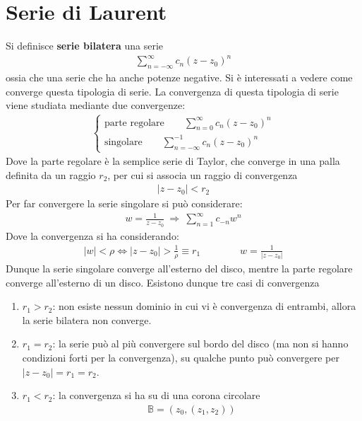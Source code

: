 \documentclass[a4paper, oneside]{article}
\begin{document}
\section{Serie di Laurent}
\begin{definition}
    Si definisce \textbf{serie bilatera}  una serie
    \begin{align}
        \sum_{n = -\infty }^{\infty } c_n(z - z_0)^{n} 
    \end{align}
    ossia che una serie che ha anche potenze negative. Si è interessati 
    a vedere come converge questa tipologia di serie. La convergenza
    di questa tipologia di serie viene studiata mediante due convergenze:
    \begin{align}
        \left\{\begin{array}{l}
            \text{parte regolare} \qquad \sum_{n = 0}^{\infty } c_n(z - z_0)^{n} \\
            \text{singolare} \qquad \sum_{n = -\infty }^{-1} c_n(z - z_0)^{n} 
        \end{array}\right.
    \end{align}
    Dove la parte regolare è la semplice serie di Taylor, che converge in una
    palla definita da un raggio $r_2$, per cui si associa un raggio di convergenza
    \begin{align}
        \left| z - z_0 \right| < r_2
    \end{align}
    Per far convergere la serie singolare si può considerare:
    \begin{align}
        w = \frac{1}{z - z_0} \ \Longrightarrow \ \sum_{n = 1}^{\infty } c_{-n}w^{n}
    \end{align}
    Dove la convergenza si ha considerando:
    \begin{align}
        \left| w \right| < \rho \Longleftrightarrow  \left| z - z_0 \right|   > \frac{1}{\rho} \equiv r_1 \qquad \qquad w = \frac{1}{\left| z - z_0 \right| }
    \end{align}
    Dunque la serie singolare converge all'esterno del disco, mentre la parte regolare converge all'esterno di un disco. Esistono dunque 
    tre casi di convergenza
    \begin{enumerate}
        \item $r_1 > r_2$: non esiste nessun dominio in cui vi è convergenza di entrambi, allora 
        la serie bilatera non converge.
        \item $r_1 = r_2$: la serie può al più convergere sul bordo 
        del disco (ma non si hanno condizioni forti per la convergenza), su qualche 
        punto può convergere per $\left| z - z_0  \right| = r_1 = r_2$.
        \item $r_1 < r_2$: la convergenza si ha su di una corona circolare 
        \begin{align}
            \mathbb{B} = (z_0, (z_1, z_2))
        \end{align}
    \end{enumerate}
\end{definition} \noindent
\end{document}
